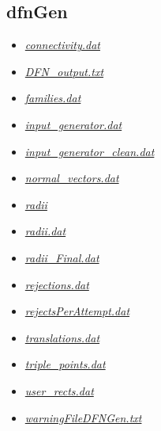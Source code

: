 \documentclass[letterpaper,10pt,english]{sphinxmanual}
\begin{document}
\subsection{dfnGen}
\label{output:dfngen}\begin{itemize}
\item {} 
{\hyperref[output:connectivity-dat]{\emph{connectivity.dat}}}

\item {} 
{\hyperref[output:dfn-output-txt]{\emph{DFN\_output.txt}}}

\item {} 
{\hyperref[output:families-dat]{\emph{families.dat}}}

\item {} 
{\hyperref[output:input-generator-dat]{\emph{input\_generator.dat}}}

\item {} 
{\hyperref[output:input-generator-clean-dat]{\emph{input\_generator\_clean.dat}}}

\item {} 
{\hyperref[output:normal-vectors-dat]{\emph{normal\_vectors.dat}}}

\item {} 
{\hyperref[output:radii]{\emph{radii}}}

\item {} 
{\hyperref[output:radii-dat]{\emph{radii.dat}}}

\item {} 
{\hyperref[output:radii-final-dat]{\emph{radii\_Final.dat}}}

\item {} 
{\hyperref[output:rejections-dat]{\emph{rejections.dat}}}

\item {} 
{\hyperref[output:rejectsperattempt-dat]{\emph{rejectsPerAttempt.dat}}}

\item {} 
{\hyperref[output:translations-dat]{\emph{translations.dat}}}

\item {} 
{\hyperref[output:triple-points-dat]{\emph{triple\_points.dat}}}

\item {} 
{\hyperref[output:user-rects-dat]{\emph{user\_rects.dat}}}

\item {} 
{\hyperref[output:warningfiledfngen-txt]{\emph{warningFileDFNGen.txt}}}

\end{itemize}
\end{document}

